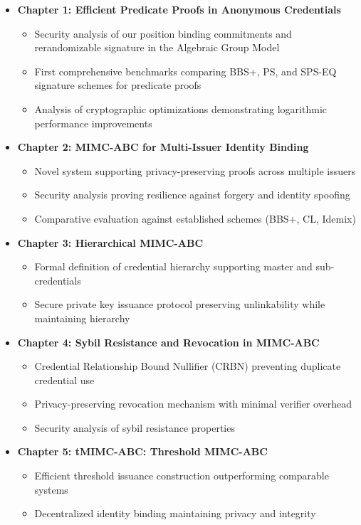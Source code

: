 \begin{itemize}
    \item \textbf{Chapter 1: Efficient Predicate Proofs in Anonymous Credentials}
    \begin{itemize}
        \item Security analysis of our position binding commitments and rerandomizable signature in the Algebraic Group Model
        \item First comprehensive benchmarks comparing BBS+, PS, and SPS-EQ signature schemes for predicate proofs
        \item Analysis of cryptographic optimizations demonstrating logarithmic performance improvements
    \end{itemize}

    \item \textbf{Chapter 2: MIMC-ABC for Multi-Issuer Identity Binding}
    \begin{itemize}
        \item Novel system supporting privacy-preserving proofs across multiple issuers
        \item Security analysis proving resilience against forgery and identity spoofing
        \item Comparative evaluation against established schemes (BBS+, CL, Idemix)
    \end{itemize}

    \item \textbf{Chapter 3: Hierarchical MIMC-ABC}
    \begin{itemize}
        \item Formal definition of credential hierarchy supporting master and sub-credentials
        \item Secure private key issuance protocol preserving unlinkability while maintaining hierarchy
    \end{itemize}

    \item \textbf{Chapter 4: Sybil Resistance and Revocation in MIMC-ABC}
    \begin{itemize}
        \item Credential Relationship Bound Nullifier (CRBN) preventing duplicate credential use
        \item Privacy-preserving revocation mechanism with minimal verifier overhead
        \item Security analysis of sybil resistance properties
    \end{itemize}

    \item \textbf{Chapter 5: tMIMC-ABC: Threshold MIMC-ABC}
    \begin{itemize}
        \item Efficient threshold issuance construction outperforming comparable systems
        \item Decentralized identity binding maintaining privacy and integrity
    \end{itemize}
\end{itemize}

